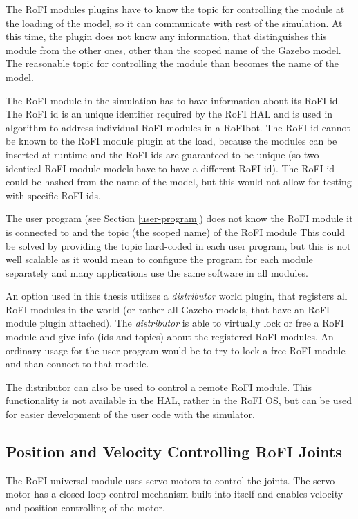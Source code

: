 \documentclass[
  digital, %
  table,   %
  oneside, %
  nolof,     %
  nolot,     %
]{fithesis3}
\begin{document}
The RoFI modules plugins have to know the topic for controlling the module at the loading of the model, so it can communicate with rest of the simulation.
At this time, the plugin does not know any information, that distinguishes this module from the other ones, other than the scoped name of the Gazebo model.
The reasonable topic for controlling the module than becomes the name of the model.

The RoFI module in the simulation has to have information about its RoFI id.
The RoFI id is an unique identifier required by the RoFI HAL and is used in algorithm to address individual RoFI modules in a RoFIbot.
The RoFI id cannot be known to the RoFI module plugin at the load, because the modules can be inserted at runtime and the RoFI ids are guaranteed to be unique (so two identical RoFI module models have to have a different RoFI id).
The RoFI id could be hashed from the name of the model, but this would not allow for testing with specific RoFI ids.

The user program (see Section \ref{user-program}) does not know the RoFI module it is connected to and the topic (the scoped name) of the RoFI module
This could be solved by providing the topic hard-coded in each user program, but this is not well scalable as it would mean to configure the program for each module separately and many applications use the same software in all modules.

An option used in this thesis utilizes a \emph{distributor} world plugin, that registers all RoFI modules in the world (or rather all Gazebo models, that have an RoFI module plugin attached).
The \emph{distributor} is able to virtually lock or free a RoFI module and give info (ids and topics) about the registered RoFI modules.
An ordinary usage for the user program would be to try to lock a free RoFI module and than connect to that module.

The distributor can also be used to control a remote RoFI module.
This functionality is not available in the HAL, rather in the RoFI OS, but can be used for easier development of the user code with the simulator.

\subsection{Position and Velocity Controlling RoFI Joints}

The RoFI universal module uses servo motors to control the joints.
The servo motor has a closed-loop control mechanism built into itself and enables velocity and position controlling of the motor.
\end{document}
